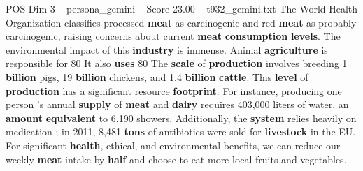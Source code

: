 \begin{textsample}{POS Dim 3 – persona\_gemini – Score 23.00 – t932\_gemini.txt}  \label{ex:f3_pos_041}
The World Health Organization classifies processed \textbf{meat} as carcinogenic and red \textbf{meat} as probably carcinogenic, raising concerns about current \textbf{meat} \textbf{consumption} \textbf{levels}.
The environmental impact of this \textbf{industry} is immense.
Animal \textbf{agriculture} is responsible for 80 %
It also \textbf{uses} 80 %
The \textbf{scale} of \textbf{production} involves breeding 1 \textbf{billion} pigs, 19 \textbf{billion} chickens, and 1.4 \textbf{billion} \textbf{cattle}.
This \textbf{level} of \textbf{production} has a significant resource \textbf{footprint}.
For instance, producing one person 's annual \textbf{supply} of \textbf{meat} and \textbf{dairy} requires 403,000 liters of water, an \textbf{amount} \textbf{equivalent} to 6,190 showers.
Additionally, the \textbf{system} relies heavily on medication ; in 2011, 8,481 \textbf{tons} of antibiotics were sold for \textbf{livestock} in the EU.
For significant \textbf{health}, ethical, and environmental benefits, we can reduce our weekly \textbf{meat} intake by \textbf{half} and choose to eat more local fruits and vegetables.

\end{textsample}
